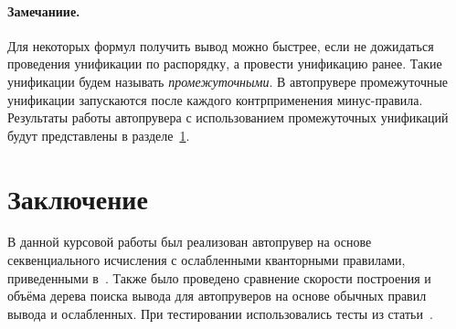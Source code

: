 \documentclass{cw1}
\begin{document}
\paragraph{Замечаниие.} Для некоторых формул получить вывод можно быстрее, если не дожидаться
проведения унификации по распорядку, а провести унификацию ранее. Такие унификации будем
называть \textit{промежуточными}. В автопрувере промежуточные унификации запускаются после
каждого контрприменения минус-правила. Результаты работы автопрувера с использованием промежуточных унификаций
будут представлены в разделе~\ref{sec:results}.

\section{Заключение}
\label{sec:results}
В данной курсовой работы был реализован автопрувер на основе секвенциального исчисления с
ослабленными кванторными правилами, приведенными в~\cite{konev}. Также было проведено сравнение
скорости построения и объёма дерева поиска вывода для автопруверов на основе обычных правил вывода
и ослабленных. При тестировании использовались тесты из статьи~\cite{tests}.
\newcommand{\Title}[1]{\multicolumn{3}{|c|}{#1}}
\end{document}
